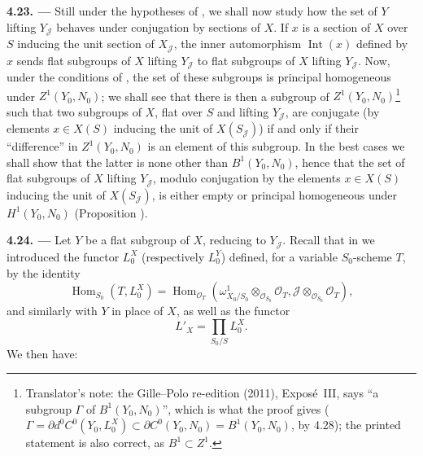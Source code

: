 

\medskip
\noindent{}\textbf{4.23. ---}
Still under the hypotheses of , we shall now study how the set of
\(Y\) lifting \(Y_{\mathscr J}\) behaves under conjugation by sections of
\(X\). If \(x\) is a section of \(X\) over \(S\) inducing the unit section
of \(X_{\mathscr J}\), the inner automorphism \(\operatorname{Int}(x)\)
defined by \(x\) sends flat subgroups of \(X\) lifting \(Y_{\mathscr J}\)
to flat subgroups of \(X\) lifting \(Y_{\mathscr J}\). Now, under the
conditions of , the set of these subgroups is principal homogeneous
under \(Z^1(Y_0,N_0)\); we shall see that there is then a subgroup of
\(Z^1(Y_0,N_0)\)\footnote{Translator's note: the Gille--Polo re-edition (2011), Exposé~III, says ``a subgroup
\(\Gamma\) of \(B^1(Y_0,N_0)\)'', which is what the proof gives
(\(\Gamma=\partial d^0C^0(Y_0,L_0^X)\subset\partial C^0(Y_0,N_0)=B^1(Y_0,N_0)\),
by 4.28); the printed statement is also correct, as \(B^1\subset Z^1\).} such that two subgroups of \(X\), flat over \(S\) and
lifting \(Y_{\mathscr J}\), are conjugate (by elements \(x\in X(S)\)
inducing the unit of \(X(S_{\mathscr J})\)) if and only if their
``difference'' in \(Z^1(Y_0,N_0)\) is an element of this subgroup. In the
best cases we shall show that the latter is none other than
\(B^1(Y_0,N_0)\), hence that the set of flat subgroups of \(X\) lifting
\(Y_{\mathscr J}\), modulo conjugation by the elements \(x\in X(S)\)
inducing the unit of \(X(S_{\mathscr J})\), is either empty or principal
homogeneous under \(H^1(Y_0,N_0)\) (Proposition ).

\medskip
\noindent{}\textbf{4.24. ---}
Let \(Y\) be a flat subgroup of \(X\), reducing to \(Y_{\mathscr J}\).
Recall that in  we introduced
the functor \(L_0^X\) (respectively \(L_0^Y\)) defined, for a variable
\(S_0\)-scheme \(T\), by the identity
\[
 \operatorname{Hom}_{S_0}(T,L_0^X)
 =\operatorname{Hom}_{\mathscr O_T}
 \left(
  \omega^1_{X_0/S_0}\otimes_{\mathscr O_{S_0}}\mathscr O_T,
  \mathscr J\otimes_{\mathscr O_{S_0}}\mathscr O_T
 \right),
\]
and similarly with \(Y\) in place of \(X\), as well as the functor
\[
 L'_X=\prod_{S_0/S}L_0^X.
\]
We then have:

